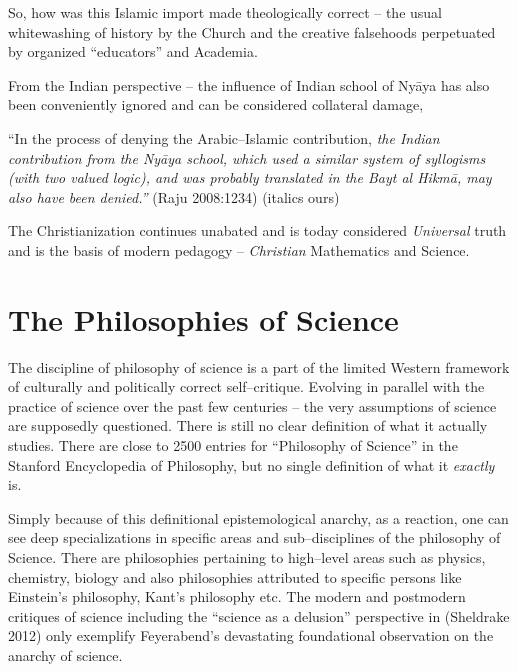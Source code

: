 So, how was this Islamic import made theologically correct – the usual whitewashing of history by the Church and the creative falsehoods perpetuated by organized “educators” and Academia.

From the Indian perspective – the influence of Indian school of Nyāya has also been conveniently ignored and can be considered collateral damage,

\begin{myquote}
“In the process of denying the Arabic–Islamic contribution, \textit{the Indian contribution from the Nyāya school, which used a similar system of syllogisms (with two valued logic), and was probably translated in the Bayt al Hikmā, may also have been denied.”} \hfill (Raju 2008:1234) (italics ours)
\end{myquote}

The Christianization continues unabated and is today considered \textit{Universal} truth and is the basis of modern pedagogy – \textit{Christian} Mathematics and Science.


\section*{The Philosophies of Science}

The discipline of philosophy of science is a part of the limited Western framework of culturally and politically correct self–critique. Evolving in parallel with the practice of science over the past few centuries – the very assumptions of science are supposedly questioned. There is still no clear definition of what it actually studies. There are close to 2500 entries for “Philosophy of Science” in the Stanford Encyclopedia of Philosophy, but no single definition of what it \textit{exactly} is.

Simply because of this definitional epistemological anarchy, as a reaction, one can see deep specializations in specific areas and sub–disci\-plines of the philosophy of Science. There are philosophies pertaining to high–level areas such as physics, chemistry, biology and also philosophies attributed to specific persons like Einstein’s philosophy, Kant’s philosophy etc. The modern and postmodern critiques of science including the “science as a delusion” perspective in (Sheldrake 2012) only exemplify Feyerabend’s devastating foundational observation on the anarchy of science.

